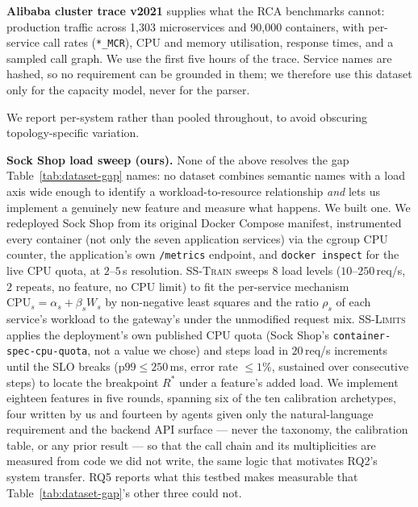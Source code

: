 \documentclass[journal, 10pt]{IEEEtran}
\begin{document}
\textbf{Alibaba cluster trace v2021} \cite{alibaba2021} supplies what the RCA
benchmarks cannot: production traffic across 1{,}303 microservices and 90{,}000
containers, with per-service call rates (\texttt{*\_MCR}), CPU and memory
utilisation, response times, and a sampled call graph. We use the first five
hours of the trace. Service names are hashed, so no requirement can be grounded
in them; we therefore use this dataset only for the capacity model, never for
the parser.

We report per-system rather than pooled throughout,
to avoid obscuring topology-specific variation.

\textbf{Sock Shop load sweep (ours).} None of the above resolves the gap Table~\ref{tab:dataset-gap}
names: no dataset combines semantic names with a load axis wide enough to identify a
workload-to-resource relationship \emph{and} lets us implement a genuinely new feature and measure
what happens. We built one. We redeployed Sock Shop from its original Docker Compose manifest,
instrumented every container (not only the seven application services) via the cgroup CPU counter,
the application's own \texttt{/metrics} endpoint, and \texttt{docker inspect} for the live CPU quota,
at $2$--$5\,$s resolution. \textsc{SS-Train} sweeps $8$ load levels ($10$--$250\,$req/s, $2$ repeats,
no feature, no CPU limit) to fit the per-service mechanism $\mathrm{CPU}_s=\alpha_s+\beta_s W_s$ by
non-negative least squares and the ratio $\rho_s$ of each service's workload to the gateway's under
the unmodified request mix. \textsc{SS-Limits} applies the deployment's own published CPU quota
(Sock Shop's \texttt{container-spec-cpu-quota}, not a value we chose) and steps load in $20\,$req/s
increments until the SLO breaks ($\mathrm{p99}\le250\,$ms, error rate $\le1\%$, sustained over
consecutive steps) to locate the breakpoint $R^{*}$ under a feature's added load. We implement eighteen
features in five rounds, spanning six of the ten calibration archetypes, four written by us and
fourteen by agents given
only the natural-language requirement and the backend API surface --- never the taxonomy, the
calibration table, or any prior result --- so that the call chain and its multiplicities are measured
from code we did not write, the same logic that motivates RQ2's system transfer. RQ5 reports what this
testbed makes measurable that Table~\ref{tab:dataset-gap}'s other three could not.
\end{document}
